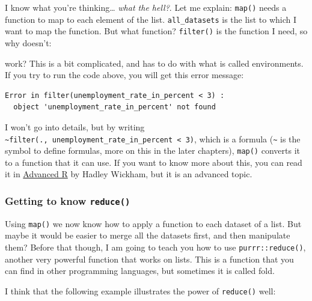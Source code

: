 \documentclass[]{gitbook}
\newenvironment{Shaded}{\begin{snugshade}}{\end{snugshade}}
\newcommand{\DecValTok}[1]{\textcolor[rgb]{0.00,0.00,0.81}{#1}}
\newcommand{\KeywordTok}[1]{\textcolor[rgb]{0.13,0.29,0.53}{\textbf{#1}}}
\newcommand{\NormalTok}[1]{#1}
\newcommand{\OperatorTok}[1]{\textcolor[rgb]{0.81,0.36,0.00}{\textbf{#1}}}
\newcommand{\StringTok}[1]{\textcolor[rgb]{0.31,0.60,0.02}{#1}}
\theoremstyle{definition}
\theoremstyle{definition}
\theoremstyle{definition}
\theoremstyle{remark}
\begin{document}
I know what you're thinking\ldots{} \emph{what the hell?}. Let me
explain: \texttt{map()} needs a function to map to each element of the
list. \texttt{all\_datasets} is the list to which I want to map the
function. But what function? \texttt{filter()} is the function I need,
so why doesn't:

\begin{Shaded}
\end{Shaded}

work? This is a bit complicated, and has to do with what is called
environments. If you try to run the code above, you will get this error
message:

\begin{verbatim}
Error in filter(unemployment_rate_in_percent < 3) :
  object 'unemployment_rate_in_percent' not found
\end{verbatim}

I won't go into details, but by writing
\texttt{\textasciitilde{}filter(.,\ unemployment\_rate\_in\_percent\ \textless{}\ 3)},
which is a formula (\texttt{\textasciitilde{}} is the symbol to define
formulas, more on this in the later chapters), \texttt{map()} converts
it to a function that it can use. If you want to know more about this,
you can read it in
\href{http://adv-r.had.co.nz/Functional-programming.html\#closures}{Advanced
R} by Hadley Wickham, but it is an advanced topic.

\hypertarget{getting-to-know-reduce}{%
\subsubsection{\texorpdfstring{Getting to know
\texttt{reduce()}}{Getting to know reduce()}}\label{getting-to-know-reduce}}

Using \texttt{map()} we now know how to apply a function to each dataset
of a list. But maybe it would be easier to merge all the datasets first,
and then manipulate them? Before that though, I am going to teach you
how to use \texttt{purrr::reduce()}, another very powerful function that
works on lists. This is a function that you can find in other
programming languages, but sometimes it is called fold.

I think that the following example illustrates the power of
\texttt{reduce()} well:
\end{document}
